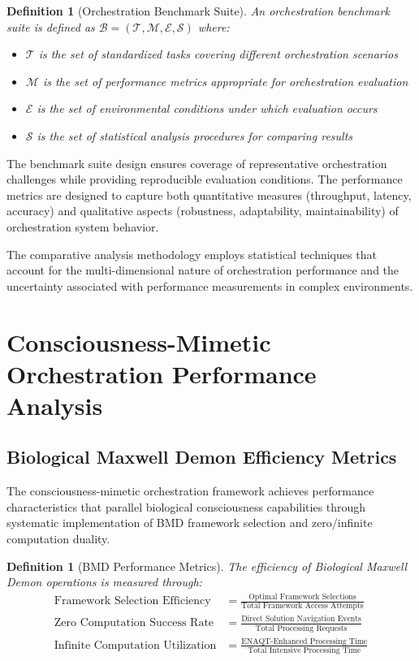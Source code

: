 \documentclass[12pt,a4paper]{article}
\newtheorem{definition}[theorem]{Definition}
\begin{document}
{{{\begin{definition}[Orchestration Benchmark Suite]
An orchestration benchmark suite is defined as $\mathcal{B} = (\mathcal{T}, \mathcal{M}, \mathcal{E}, \mathcal{S})$ where:
\begin{itemize}
\item $\mathcal{T}$ is the set of standardized tasks covering different orchestration scenarios
\item $\mathcal{M}$ is the set of performance metrics appropriate for orchestration evaluation
\item $\mathcal{E}$ is the set of environmental conditions under which evaluation occurs
\item $\mathcal{S}$ is the set of statistical analysis procedures for comparing results
\end{itemize}
\end{definition}

The benchmark suite design ensures coverage of representative orchestration challenges while providing reproducible evaluation conditions. The performance metrics are designed to capture both quantitative measures (throughput, latency, accuracy) and qualitative aspects (robustness, adaptability, maintainability) of orchestration system behavior.

The comparative analysis methodology employs statistical techniques that account for the multi-dimensional nature of orchestration performance and the uncertainty associated with performance measurements in complex environments.

\section{Consciousness-Mimetic Orchestration Performance Analysis}

\subsection{Biological Maxwell Demon Efficiency Metrics}

The consciousness-mimetic orchestration framework achieves performance characteristics that parallel biological consciousness capabilities through systematic implementation of BMD framework selection and zero/infinite computation duality.

\begin{definition}[BMD Performance Metrics]
The efficiency of Biological Maxwell Demon operations is measured through:
\begin{align}
\text{Framework Selection Efficiency} &= \frac{\text{Optimal Framework Selections}}{\text{Total Framework Access Attempts}} \\
\text{Zero Computation Success Rate} &= \frac{\text{Direct Solution Navigation Events}}{\text{Total Processing Requests}} \\
\text{Infinite Computation Utilization} &= \frac{\text{ENAQT-Enhanced Processing Time}}{\text{Total Intensive Processing Time}}
\end{align}
\end{definition}

}}}
\end{document}
